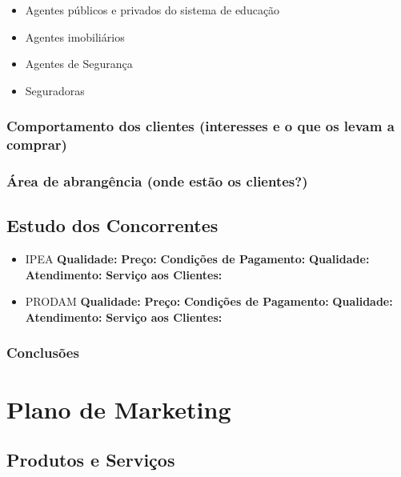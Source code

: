 \documentclass[
	12pt,				%
	openright,			%
	twoside,			%
	a4paper,			%
	english,			%
	french,				%
	spanish,			%
	brazil,				%
	]{abntex2}
\begin{document}
\begin{itemize}
	\item Agentes públicos e privados do sistema de educação
	\item Agentes imobiliários
	\item Agentes de Segurança
	\item Seguradoras
\end{itemize}

\subsection{Comportamento dos clientes (interesses e o que os levam a comprar)}

\subsection{Área de abrangência (onde estão os clientes?)}

\section{Estudo dos Concorrentes}

\begin{itemize}
	\item IPEA 
		\subitem \textbf{Qualidade:} 
		\subitem \textbf{Preço:} 
		\subitem \textbf{Condições de Pagamento:} 
		\subitem \textbf{Qualidade:} 
		\subitem \textbf{Atendimento:} 
		\subitem \textbf{Serviço aos Clientes:} 

	\item PRODAM 
		\subitem \textbf{Qualidade:} 
		\subitem \textbf{Preço:} 
		\subitem \textbf{Condições de Pagamento:} 
		\subitem \textbf{Qualidade:} 
		\subitem \textbf{Atendimento:} 
		\subitem \textbf{Serviço aos Clientes:} 
		 
\end{itemize}

\subsection*{Conclusões}



\chapter{Plano de Marketing}

\section{Produtos e Serviços}
\end{document}
